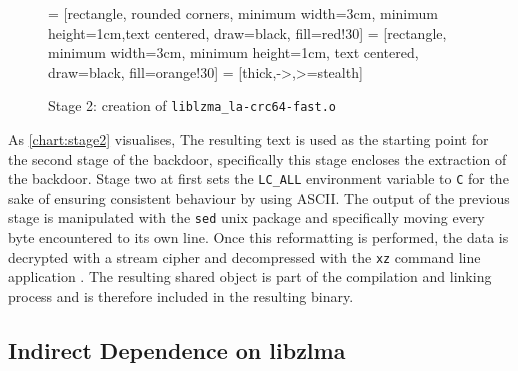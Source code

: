 \begin{figure}[H]
    \centering

     = [rectangle, rounded corners, minimum width=3cm, minimum height=1cm,text centered, draw=black, fill=red!30]
     = [rectangle, minimum width=3cm, minimum height=1cm, text centered, draw=black, fill=orange!30]
     = [thick,->,>=stealth]
    \label{chart:stage2}
    \caption{Stage 2: creation of \texttt{liblzma\_la-crc64-fast.o}}
\end{figure}

As \autoref{chart:stage2} visualises, The resulting text is used as the
starting point for the second stage of the backdoor, specifically this stage
encloses the extraction of the backdoor. Stage two at first sets the
\texttt{LC\_ALL} environment variable to \texttt{C} for the sake of ensuring
consistent behaviour by using ASCII. The output of the previous stage is
manipulated with the \texttt{sed} unix package and specifically moving every
byte encountered to its own line. Once this reformatting is performed, the data
is decrypted with a stream cipher and decompressed with the \texttt{xz} command
line application \cite{arstechnica2024xzutils}. The resulting shared object is
part of the compilation and linking process and is therefore included in the
resulting binary.

\subsection{Indirect Dependence on libzlma}
\label{sec:dependence}

